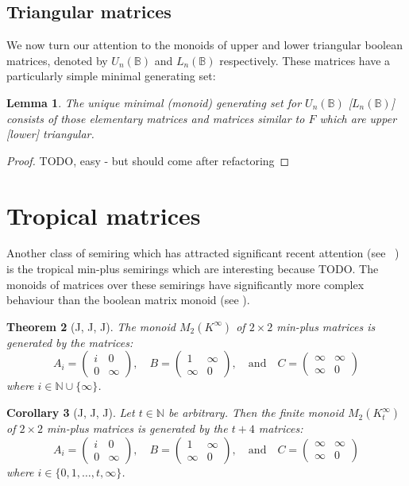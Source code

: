 \documentclass[11pt]{article}
\newtheorem{thm}{Theorem}[section]
\newtheorem{cor}[thm]{Corollary}
\newtheorem{lemma}[thm]{Lemma}
\numberwithin{equation}{section}
\newcommand{\B}{\mathbb{B}}
\newcommand{\UTn}{U_n(\B)}
\newcommand{\LTn}{L_n(\B)}
\newcommand{\N}{\mathbb{N}}
\newcommand{\mat}[4]{\begin{pmatrix}#1&#2\\#3&#4\end{pmatrix}}
\begin{document}
\subsection{Triangular matrices}
We now turn our attention to the monoids of upper and lower triangular boolean
matrices, denoted by $\UTn$ and $\LTn$ respectively. These matrices have a
particularly simple minimal generating set:

\begin{lemma}
  The unique minimal (monoid) generating set for $\UTn$ [$\LTn$] consists of
  those elementary matrices and matrices similar to $F$ which are upper [lower]
  triangular.
\end{lemma}

\begin{proof}
  TODO, easy - but should come after refactoring
\end{proof}

\section{Tropical matrices}
Another class of semiring which has attracted significant recent attention (see
~\cite{TODO}) is the tropical min-plus semirings which are interesting because
TODO. The monoids of matrices over these semirings have significantly more
complex behaviour than the boolean matrix monoid (see \cite{TODO}).

\begin{thm}[J, J, J]\label{thm-min-plus}
  The monoid $M_{2}(K^{\infty})$ of $2 \times 2$ min-plus matrices is
  generated by the matrices:
  \begin{equation*}
          A_{i} = \mat{i}{0}{0}{\infty},
    \quad B     = \mat{1}{\infty}{\infty}{0},
    \quad \text{and}
    \quad C     =  \mat{\infty}{\infty}{\infty}{0}
  \end{equation*}
  where $i \in \N \cup \{\infty\}$.
\end{thm}

\begin{cor}[J, J, J]\label{cor-finite-min-plus}
  Let $t \in \N$ be arbitrary. Then the finite monoid $M_{2}(K^{\infty}_t)$ of
  $2 \times 2$ min-plus matrices is generated by the $t + 4$ matrices:
  \begin{equation*}
          A_{i} = \mat{i}{0}{0}{\infty},
    \quad B     = \mat{1}{\infty}{\infty}{0},
    \quad \text{and}
    \quad C     =  \mat{\infty}{\infty}{\infty}{0}
  \end{equation*}
  where $i \in \{0, 1, \ldots, t, \infty\}$.
\end{cor}
\end{document}
